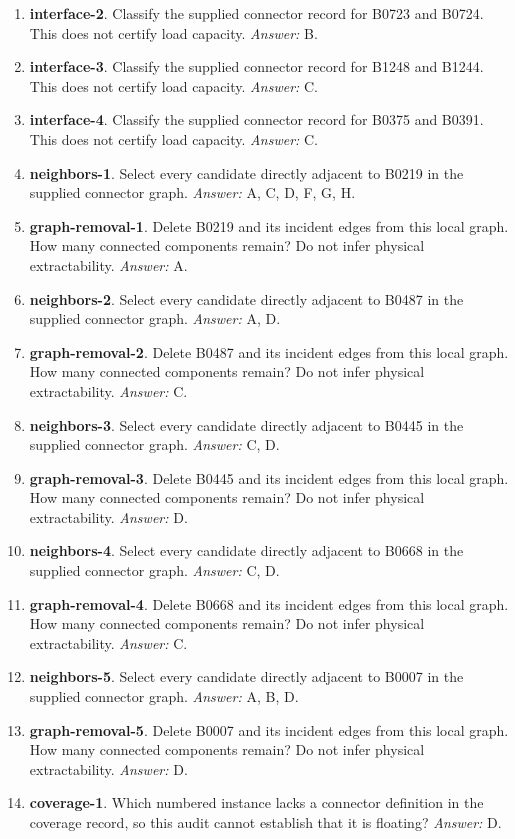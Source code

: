 \begin{enumerate}
\item \textbf{interface-2}. Classify the supplied connector record for B0723 and B0724. This does not certify load capacity. \textit{Answer:} B.
\item \textbf{interface-3}. Classify the supplied connector record for B1248 and B1244. This does not certify load capacity. \textit{Answer:} C.
\item \textbf{interface-4}. Classify the supplied connector record for B0375 and B0391. This does not certify load capacity. \textit{Answer:} C.
\item \textbf{neighbors-1}. Select every candidate directly adjacent to B0219 in the supplied connector graph. \textit{Answer:} A, C, D, F, G, H.
\item \textbf{graph-removal-1}. Delete B0219 and its incident edges from this local graph. How many connected components remain? Do not infer physical extractability. \textit{Answer:} A.
\item \textbf{neighbors-2}. Select every candidate directly adjacent to B0487 in the supplied connector graph. \textit{Answer:} A, D.
\item \textbf{graph-removal-2}. Delete B0487 and its incident edges from this local graph. How many connected components remain? Do not infer physical extractability. \textit{Answer:} C.
\item \textbf{neighbors-3}. Select every candidate directly adjacent to B0445 in the supplied connector graph. \textit{Answer:} C, D.
\item \textbf{graph-removal-3}. Delete B0445 and its incident edges from this local graph. How many connected components remain? Do not infer physical extractability. \textit{Answer:} D.
\item \textbf{neighbors-4}. Select every candidate directly adjacent to B0668 in the supplied connector graph. \textit{Answer:} C, D.
\item \textbf{graph-removal-4}. Delete B0668 and its incident edges from this local graph. How many connected components remain? Do not infer physical extractability. \textit{Answer:} C.
\item \textbf{neighbors-5}. Select every candidate directly adjacent to B0007 in the supplied connector graph. \textit{Answer:} A, B, D.
\item \textbf{graph-removal-5}. Delete B0007 and its incident edges from this local graph. How many connected components remain? Do not infer physical extractability. \textit{Answer:} D.
\item \textbf{coverage-1}. Which numbered instance lacks a connector definition in the coverage record, so this audit cannot establish that it is floating? \textit{Answer:} D.

\end{enumerate}
